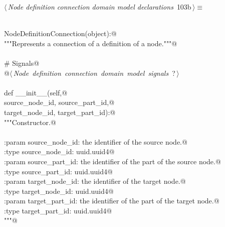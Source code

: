 \documentclass[
    a4paper,      %
    10pt,         %
    openright,    %
    notitlepage,  %
    parskip=half, %
]{scrreprt}       %
\theoremstyle{definition}                    %
\begin{document}
\begin{flushleft} \small
\begin{minipage}{\linewidth}\label{scrap168}\raggedright\small
{} $\langle\,${\itshape Node definition connection domain model declarations}\nobreak\ {\footnotesize {103b}}$\,\rangle\equiv$
\vspace{-1exm}
\begin{list}{}{} \item
\mbox{}\lstinline@@\\
\mbox{}\lstinline@class NodeDefinitionConnection(object):@\\
\mbox{}\lstinline@    """Represents a connection of a definition of a node."""@\\
\mbox{}\lstinline@@\\
\mbox{}\lstinline@    # Signals@\\
\mbox{}\lstinline@    @\hbox{$\langle\,${\itshape Node definition connection domain model signals}\nobreak\ {\footnotesize ?}$\,\rangle$}\lstinline@@\\
\mbox{}\lstinline@@\\
\mbox{}\lstinline@    def __init__(self,@\\
\mbox{}\lstinline@                 source_node_id, source_part_id,@\\
\mbox{}\lstinline@                 target_node_id, target_part_id):@\\
\mbox{}\lstinline@        """Constructor.@\\
\mbox{}\lstinline@@\\
\mbox{}\lstinline@        :param source_node_id: the identifier of the source node.@\\
\mbox{}\lstinline@        :type  source_node_id: uuid.uuid4@\\
\mbox{}\lstinline@        :param source_part_id: the identifier of the part of the source node.@\\
\mbox{}\lstinline@        :type  source_part_id: uuid.uuid4@\\
\mbox{}\lstinline@        :param target_node_id: the identifier of the target node.@\\
\mbox{}\lstinline@        :type  target_node_id: uuid.uuid4@\\
\mbox{}\lstinline@        :param target_part_id: the identifier of the part of the target node.@\\
\mbox{}\lstinline@        :type  target_part_id: uuid.uuid4@\\
\mbox{}\lstinline@        """@\\

\end{list}
\end{minipage}
\end{flushleft}
\end{document}
